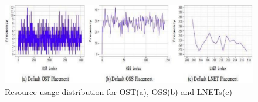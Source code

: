 \begin{figure}[tbh]
  \centering
  \includegraphics[width=\columnwidth]{graphics/infrastructure.pdf}
  \caption{Resource usage distribution for OST(a), OSS(b) and LNETs(c) }
\end{figure}
 \vspace{-2ex}








